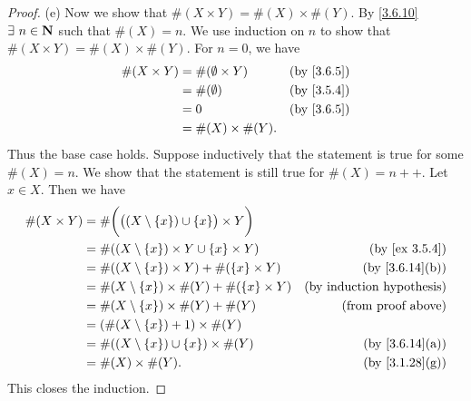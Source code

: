 \begin{proof}{(e)}
  Now we show that \(\#(X \times Y) = \#(X) \times \#(Y)\).
  By \cref{3.6.10} \(\exists\ n \in \N\) such that \(\#(X) = n\).
  We use induction on \(n\) to show that \(\#(X \times Y) = \#(X) \times \#(Y)\).
  For \(n = 0\), we have
  \begin{align*}
    \#(X \times Y) & = \#(\emptyset \times Y) & \text{(by \cref{3.6.5})} \\
                   & = \#(\emptyset)          & \text{(by \cref{3.5.4})} \\
                   & = 0                      & \text{(by \cref{3.6.5})} \\
                   & = \#(X) \times \#(Y).
  \end{align*}
  Thus the base case holds.
  Suppose inductively that the statement is true for some \(\#(X) = n\).
  We show that the statement is still true for \(\#(X) = n++\).
  Let \(x \in X\).
  Then we have
  \begin{align*}
    \#(X \times Y) & = \#\bigg(\big((X \setminus \{x\}) \cup \{x\}\big) \times Y\bigg)                                    \\
                   & = \#((X \setminus \{x\}) \times Y \cup \{x\} \times Y)            & \text{(by \cref{ex 3.5.4})}      \\
                   & = \#((X \setminus \{x\}) \times Y) + \#(\{x\} \times Y)           & \text{(by \cref{3.6.14}(b))}     \\
                   & = \#(X \setminus \{x\}) \times \#(Y) + \#(\{x\} \times Y)         & \text{(by induction hypothesis)} \\
                   & = \#(X \setminus \{x\}) \times \#(Y) + \#(Y)                      & \text{(from proof above)}        \\
                   & = (\#(X \setminus \{x\}) + 1) \times \#(Y)                                                           \\
                   & = \#((X \setminus \{x\}) \cup \{x\}) \times \#(Y)                 & \text{(by \cref{3.6.14}(a))}     \\
                   & = \#(X) \times \#(Y).                                             & \text{(by \cref{3.1.28}(g))}
  \end{align*}
  This closes the induction.
\end{proof}

